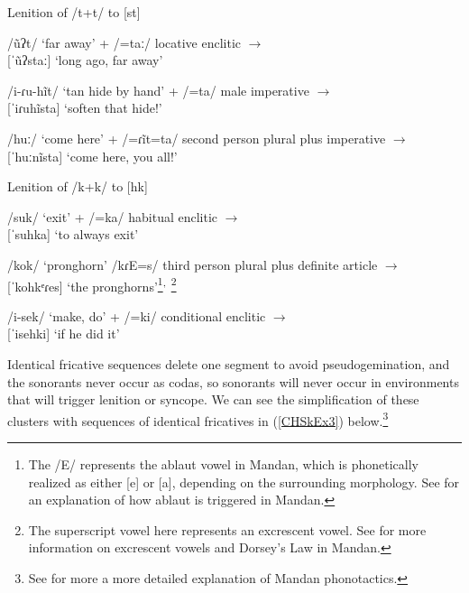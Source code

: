 \begin{exe}
    \item\label{CHSkEx1} Lenition of /t+t/ to [st]
        \begin{xlist}
                \item\label{CHSkEx1a} /ũʔt/ `far away' + /=taː/ locative enclitic $\to$ \\{[}ˈũʔstaː] `long ago, far away'
                \item\label{CHSkEx1b} /i-ɾu-hĩt/ `tan hide by hand' + /=ta/ male imperative $\to$\\
                {[}ˈiɾuhĩsta] `soften that hide!'
                \item\label{CHSkEx1c} /huː/ `come here' + /=ɾĩt=ta/ second person plural plus imperative $\to$\\
                {[}ˈhuːnĩsta] `come here, you all!'
        \end{xlist}
    \item\label{CHSkEx2} Lenition of /k+k/ to [hk]
        \begin{xlist}
            \item\label{CHSkEx2a} /suk/ `exit' + /=ka/ habitual enclitic $\to$\\
            {[}ˈsuhka] `to always exit'
            \item\label{CHSkEx2b} /kok/ `pronghorn' /kɾE=s/ third person plural plus definite article $\to$\\
            {[}ˈkohkᵉɾes] `the pronghorns'\footnote{The /E/ represents the ablaut vowel in Mandan, which is phonetically realized as either [e] or [a], depending on the surrounding morphology. See  for an explanation of how ablaut is triggered in Mandan.}\textsuperscript{,~}\footnote{The superscript vowel here represents an excrescent vowel. See  for more information on excrescent vowels and Dorsey's Law in Mandan.}
            \item\label{CHSkEx2c} /i-sek/ `make, do' + /=ki/ conditional enclitic $\to$\\
            {[}ˈisehki] `if he did it'
        \end{xlist}
\end{exe}

Identical fricative sequences delete one segment to avoid pseudogemination, and the sonorants never occur as codas, so sonorants will never occur in environments that will trigger lenition or syncope. We can see the simplification of these clusters with sequences of identical fricatives in (\ref{CHSkEx3}) below.\footnote{See  for more a more detailed explanation of Mandan phonotactics.}

